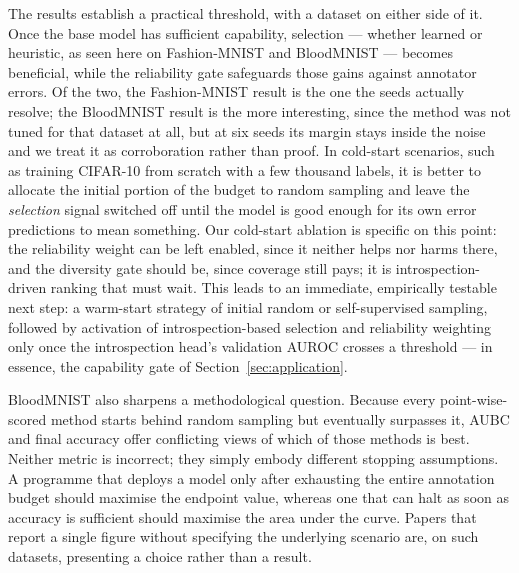 \documentclass[a4paper,fleqn,longmktitle]{cas-sc}
\begin{document}
The results establish a practical threshold, with a dataset on either
side of it. Once the base model has sufficient capability, selection
--- whether learned or heuristic, as seen here on Fashion-MNIST and
BloodMNIST --- becomes beneficial, while the reliability gate
safeguards those gains against annotator errors. Of the two, the
Fashion-MNIST result is the one the seeds actually resolve; the
BloodMNIST result is the more interesting, since the method was not
tuned for that dataset at all, but at six seeds its margin stays inside
the noise and we treat it as corroboration rather than proof. In cold-start scenarios, such as training
CIFAR-10 from scratch with a few thousand labels, it is better to
allocate the initial portion of the budget to random sampling and leave
the \emph{selection} signal switched off until the model is good enough
for its own error predictions to mean something. Our cold-start
ablation is specific on this point: the reliability weight can be left
enabled, since it neither helps nor harms there, and the diversity gate
should be, since coverage still pays; it is introspection-driven
ranking that must wait. This leads to an immediate,
empirically testable next step: a warm-start strategy of initial random
or self-supervised sampling, followed by activation of
introspection-based selection and reliability weighting only once the
introspection head's validation AUROC crosses a threshold --- in
essence, the capability gate of Section~\ref{sec:application}.

BloodMNIST also sharpens a methodological question. Because every
point-wise-scored method starts behind random sampling but eventually
surpasses it, AUBC and final accuracy offer conflicting views of which
of those methods is best. Neither metric is incorrect; they simply
embody different stopping assumptions. A programme that deploys a model
only after exhausting the entire annotation budget should maximise the
endpoint value, whereas one that can halt as soon as accuracy is
sufficient should maximise the area under the curve. Papers that report
a single figure without specifying the underlying scenario are, on such
datasets, presenting a choice rather than a result.
\end{document}
